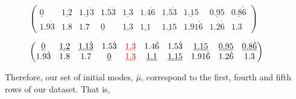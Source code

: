 \begin{example}
\begin{figure}[H]
{        \vspace{1cm}

        \begin{minipage}{\textwidth}
            \centering
            \(
            \begin{pmatrix}
                \underline{0} & \underline{1.2} &
                \underline{1.1\dot{3}} & 1.5\dot{3} & \underline{1.3}
                & 1.4\dot{6} & 1.5\dot{3} & \underline{1.15} &
                \underline{0.95} & \underline{0.8\dot{6}}
                \\
                1.9\dot{3} & 1.8 & 1.7 & \underline{0} &
                \underline{1.3} & \underline{1.1} &
                \underline{1.15} & 1.91\dot{6} & 1.2\dot{6} & 1.3
            \end{pmatrix}
            \)
            \label{fig:cao-matrix-2}
        \end{minipage}

        \vspace{1cm}

        \begin{minipage}{\textwidth}
            \centering
            \(
            \begin{pmatrix}
                \underline{0} & \underline{1.2} & \underline{1.1\dot{3}} &
                1.5\dot{3} & \textcolor{red}{\underline{1.3}} & 1.4\dot{6} &
                1.5\dot{3} & \underline{1.15} & \underline{0.95} &
                \underline{0.8\dot{6}}
                \\
                1.9\dot{3} & 1.8 & 1.7 & \underline{0} &
                \textcolor{red}{\underline{1.3}} & \underline{1.1} &
                \underline{1.15} & 1.91\dot{6} & 1.2\dot{6} & 1.3
            \end{pmatrix}
            \)
            \label{fig:cao-matrix-3}
        \end{minipage}
        }
    \end{figure}

    Therefore, our set of initial modes, \(\bar{\mu}\), correspond to the first,
    fourth and fifth rows of our dataset. That is,
    
    
\end{example}

